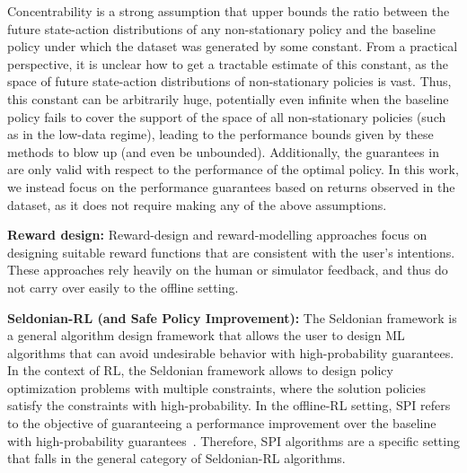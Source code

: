 Concentrability is a strong assumption that upper bounds the ratio between the future state-action distributions of any non-stationary policy and the baseline policy under which the dataset was generated by some constant. From a practical perspective, it is unclear how to get a tractable estimate of this constant, as the space of future state-action distributions of non-stationary policies is vast. Thus, this constant can be arbitrarily huge, potentially even infinite when the baseline policy fails to cover the support of the space of all non-stationary policies (such as in the low-data regime), leading to the performance bounds given by these methods to blow up (and even be unbounded). 
Additionally, the guarantees in \cite{le2019batch} are only valid with respect to the performance of the optimal policy.
In this work, we instead focus on the performance guarantees based on returns observed in the dataset, as it does not require making any of the above assumptions.


\textbf{Reward design:} 
Reward-design \citep{sorg2010internal} and reward-modelling approaches \citep{christiano2017deep, littman2017environment, leike2018scalable} focus on designing suitable reward functions that are consistent with the user's intentions. These approaches rely heavily on the human or simulator feedback, and thus do not carry over easily to the offline setting.



\textbf{Seldonian-RL (and Safe Policy Improvement):} 
The Seldonian framework \citep{Thomas2019} is a general algorithm design framework that allows the user to design ML algorithms that can avoid undesirable behavior with high-probability guarantees. 
In the context of RL, the Seldonian framework allows to design policy optimization problems with multiple constraints,
where the solution policies satisfy the constraints with high-probability. 
In the offline-RL setting, SPI refers to the objective of guaranteeing a performance improvement over the baseline with high-probability guarantees~\citep{thomas2015highImprovement, petrik2016safe, laroche2017safe}. Therefore, SPI algorithms are a specific setting that falls in the general category of Seldonian-RL algorithms. 

